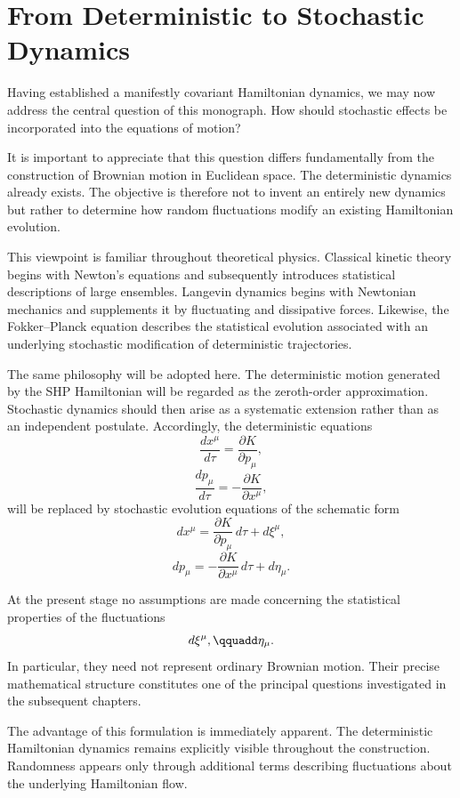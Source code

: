\section{From Deterministic to Stochastic Dynamics}
Having established a manifestly covariant Hamiltonian dynamics, we may now
address the central question of this monograph.
How should stochastic effects be incorporated into the equations of motion?

It is important to appreciate that this question differs fundamentally from
the construction of Brownian motion in Euclidean space. The deterministic
dynamics already exists. The objective is therefore not to invent an entirely
new dynamics but rather to determine how random fluctuations modify an
existing Hamiltonian evolution.

This viewpoint is familiar throughout theoretical physics. Classical kinetic
theory begins with Newton's equations and subsequently introduces statistical
descriptions of large ensembles. Langevin dynamics begins with Newtonian
mechanics and supplements it by fluctuating and dissipative forces. Likewise,
the Fokker--Planck equation describes the statistical evolution associated
with an underlying stochastic modification of deterministic trajectories.

The same philosophy will be adopted here.
The deterministic motion generated by the SHP Hamiltonian will be regarded as
the zeroth-order approximation. Stochastic dynamics should then arise as a
systematic extension rather than as an independent postulate.
Accordingly, the deterministic equations
\[\frac{dx^\mu}{d\tau}=\frac{\partial K}{\partial p_\mu},\]
\[\frac{dp_\mu}{d\tau}=-\frac{\partial K}{\partial x^\mu},\]
will be replaced by stochastic evolution equations of the schematic form
\[dx^\mu=\frac{\partial K}{\partial p_\mu}\,d\tau+d\xi^\mu,\]
\[dp_\mu=-\frac{\partial K}{\partial x^\mu}\,d\tau+d\eta_\mu.\]

At the present stage no assumptions are made concerning the statistical
properties of the fluctuations
\[d\xi^\mu,\qquadd\eta_\mu.\]
In particular, they need not represent ordinary Brownian motion.
Their precise mathematical structure constitutes one of the principal
questions investigated in the subsequent chapters.

The advantage of this formulation is immediately apparent. The deterministic
Hamiltonian dynamics remains explicitly visible throughout the construction.
Randomness appears only through additional terms describing fluctuations about
the underlying Hamiltonian flow.

